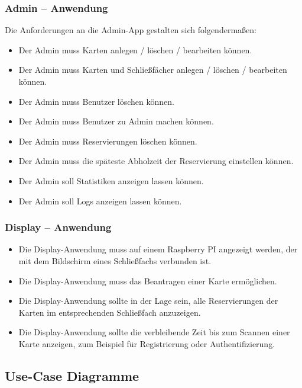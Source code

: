 \subsubsection{Admin – Anwendung}
Die Anforderungen an die Admin-App gestalten sich folgendermaßen:
\begin{itemize}
  \item Der Admin muss Karten anlegen / löschen / bearbeiten können.
  \item Der Admin muss Karten und Schließfächer anlegen / löschen / bearbeiten können.
  \item Der Admin muss Benutzer löschen können.
  \item Der Admin muss Benutzer zu Admin machen können.
  \item Der Admin muss Reservierungen löschen können.
  \item Der Admin muss die späteste Abholzeit der Reservierung einstellen können.
  \item Der Admin soll Statistiken anzeigen lassen können.
  \item Der Admin soll Logs anzeigen lassen können.
\end{itemize}

\subsubsection{Display – Anwendung}
\begin{itemize}
    \item Die Display-Anwendung muss auf einem Raspberry PI angezeigt werden, der mit dem Bildschirm eines Schließfachs verbunden ist.
    \item Die Display-Anwendung muss das Beantragen einer Karte erm\"oglichen.
    \item Die Display-Anwendung sollte in der Lage sein, alle Reservierungen der Karten im entsprechenden Schließfach anzuzeigen.
    \item Die Display-Anwendung sollte die verbleibende Zeit bis zum Scannen einer Karte anzeigen, zum Beispiel für Registrierung oder Authentifizierung.
\end{itemize}

\newpage

\subsection{Use-Case Diagramme}

